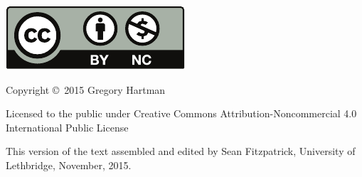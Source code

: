 \noindent\hskip -1in\begin{minipage}{2in}
\includegraphics{text/by-nc} 
\end{minipage}
\begin{minipage}{3in}
\noindent Copyright \copyright\ 2015 Gregory Hartman

Licensed to the public under Creative Commons Attribution-Noncommercial 4.0 International Public License
\end{minipage}

\bigskip

\bigskip



\bigskip

This version of the text assembled and edited by Sean Fitzpatrick, University of Lethbridge, November, 2015. 
